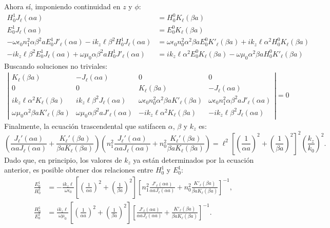 Ahora sí, imponiendo continuidad en $z$ y $\phi$:
\begin{align}
	H_0^{1} J_\ell(\alpha a) &= H_0^{0} K_\ell (\beta a)
	\label{eqn:cont1}
	\\
	E_0^{1} J_\ell(\alpha a) &= E_0^{0} K_\ell (\beta a)
	\label{eqn:cont2}
	 \\
	 -\omega \epsilon_0 n_1^2  \alpha\beta^2 a E_0^1 J'_\ell (\alpha a)-ik_z\ell \beta^2 H_0^1  J_\ell (\alpha a)
	 &= \omega \epsilon_0 n_0^2 \alpha^2 \beta a E_0^0 K'_\ell (\beta a)+ik_z\ell \alpha^2H_0^0  K_\ell (\beta a)
	 \label{eqn:cont3}
	 \\
	 -ik_z \ell \beta^2 E_0^1   J_\ell (\alpha a) + \omega \mu_0  \alpha \beta^2 a H_0^1  J'_\ell (\alpha a) &=
	 ik_z \ell \alpha^2 E_0^0   K_\ell (\beta a) -\omega \mu_0  \alpha^2 \beta a H_0^0  K'_\ell (\beta a)
	 \label{eqn:cont4}
\end{align}
Buscando soluciones no triviales:
\begin{align*}
	\left|\begin{matrix}
		K_\ell(\beta a) & -J_\ell(\alpha a) & 0 & 0
		\\
		0 & 0 & K_\ell(\beta a) & -J_\ell(\alpha a)
		\\
		ik_z\ell \alpha^2 K_\ell (\beta a) & ik_z\ell\beta^2 J_\ell (\alpha a) & \omega \epsilon_0 n_0^2  \alpha^2 \beta a K'_\ell (\beta a) & \omega \epsilon_0 n_1^2  \alpha \beta^2 a J'_\ell (\alpha a)
		\\
		\omega \mu_0  \alpha^2 \beta a   K'_\ell (\beta a) &  \omega \mu_0  \alpha \beta^2 a J'_\ell (\alpha a) & -ik_z \ell \alpha^2 K_\ell (\beta a) &  -ik_z \ell \beta^2  J_\ell (\alpha a)
	\end{matrix}\right|
	=
0
\end{align*}
Finalmente, la ecuación trascendental que satifacen $\alpha$, $\beta$ y $k_z$ es:
\begin{equation}
	\left( \frac{J_\ell'(\alpha a)}{\alpha a J_\ell(\alpha a)} + \frac{K_\ell'(\beta a)}{\beta a K_\ell(\beta a)} \right)\left( n_1^2\frac{J_\ell'(\alpha a)}{\alpha a J_\ell(\alpha a)} + n_0^2\frac{K_\ell'(\beta a)}{\beta a K_\ell(\beta a)} \right) = \ell^2 \left[ \left(\frac{1}{\alpha a}\right)^2 + \left(\frac{1}{\beta a}\right)^2 \right]^2 \left( \frac{k_z}{k_0} \right)^2 . \label{eqn:fiber_trascendental}
\end{equation}
Dado que, en principio, los valores de $k_z$ ya están determinados por la ecuación anterior, es posible obtener dos relaciones entre $H_0^1$ y $E_0^1$:
\begin{align}
\frac{E_0^1}{H_0^1} &=  -\frac{i k_z \ell}{\omega\epsilon_0}\left[ \left(\frac{1}{\alpha a}\right)^2 + \left(\frac{1}{\beta a}\right)^2 \right]  \left[ n_1^2 \frac{J'_\ell(\alpha a)}{\alpha a J_\ell(\alpha a)} + n_0^2 \frac{K'_\ell(\beta a)}{\beta a K_\ell(\beta a)} \right]^{-1} \label{eqn:fiber_polarization_E},
\\
\frac{H_0^1}{E_0^1} &=  \frac{i k_z \ell}{ \omega\mu_0}\left[ \left(\frac{1}{\alpha a}\right)^2 + \left(\frac{1}{\beta a}\right)^2 \right]  \left[ \frac{J'_\ell(\alpha a)}{\alpha a J_\ell(\alpha a)} + \frac{K'_\ell(\beta a)}{\beta a K_\ell(\beta a)} \right]^{-1} \label{eqn:fiber_polarization_H}.
\end{align}

